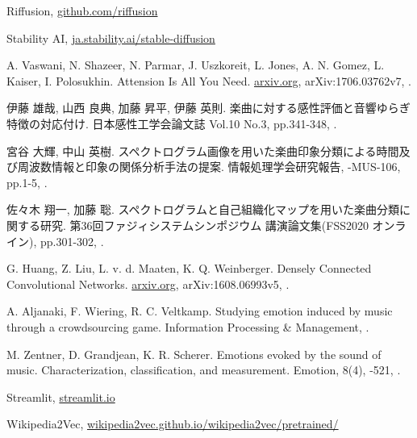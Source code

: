 \documentclass[a4paper,11pt,dvipdfmx]{jreport}
\begin{document}
\begin{thebibliography}{1}
\newblock Riffusion,
\newblock \url{github.com/riffusion}

\newblock Stability AI,
\newblock \url{ja.stability.ai/stable-diffusion}

A. Vaswani,
\newblock N. Shazeer,
\newblock N. Parmar,
\newblock J. Uszkoreit,
\newblock L. Jones,
\newblock A. N. Gomez,
\newblock L. Kaiser,
\newblock I. Polosukhin.
\newblock Attension Is All You Need.
\newblock \url{arxiv.org},
\newblock arXiv:1706.03762v7, 
.

伊藤 雄哉, 
\newblock 山西 良典,
\newblock 加藤 昇平,
\newblock 伊藤 英則.
\newblock 楽曲に対する感性評価と音響ゆらぎ特徴の対応付け.
\newblock 日本感性工学会論文誌 Vol.10 No.3,
\newblock pp.341-348, 
.

宮谷 大輝,
\newblock 中山 英樹.
\newblock スペクトログラム画像を用いた楽曲印象分類による時間及び周波数情報と印象の関係分析手法の提案.
\newblock 情報処理学会研究報告,
-MUS-106,
\newblock pp.1-5, 
.

佐々木 翔一,
\newblock 加藤 聡.
\newblock スペクトログラムと自己組織化マップを用いた楽曲分類に関する研究.
\newblock 第36回ファジィシステムシンポジウム 講演論文集(FSS2020 オンライン),
\newblock pp.301-302, 
.

G. Huang,
\newblock Z. Liu,
\newblock L. v. d. Maaten,
\newblock K. Q. Weinberger.
\newblock Densely Connected Convolutional Networks.
\newblock \url{arxiv.org},
\newblock arXiv:1608.06993v5, 
.

A. Aljanaki,
\newblock F. Wiering,
\newblock R. C. Veltkamp.
\newblock Studying emotion induced by music through a crowdsourcing game.
\newblock Information Processing \& Management, 
.

M. Zentner,
\newblock D. Grandjean,
\newblock K. R. Scherer.
\newblock Emotions evoked by the sound of music.
\newblock Characterization, classification, and measurement.
\newblock Emotion, 8(4),
-521,
.

\newblock Streamlit,
\newblock \url{streamlit.io}

\newblock Wikipedia2Vec,
\newblock \url{wikipedia2vec.github.io/wikipedia2vec/pretrained/}

\end{thebibliography}
\end{document}
